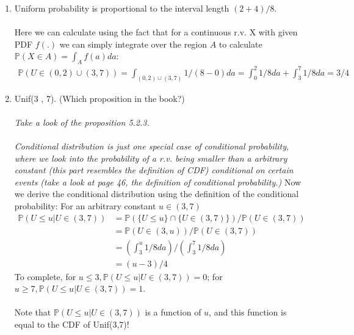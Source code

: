 

\setcounter{theorem}{9}
\begin{exercise}[BH.5.10]
\begin{solution}
    \begin{enumerate}
        \item Uniform probability is proportional to the interval length $(2+4)/8$.\\~\\
    	Here we can calculate using the fact that for a continuous r.v. X with given PDF $f(.)$ we can simply integrate over the region $A$ to calculate $\mathbb{P}(X\in A) = \int_A f(a) da$:
    	\begin{align*}
    		\mathbb{P}\left(U\in (0,2) \cup (3,7)  \right) = \int_{(0,2) \cup (3,7)} 1/(8-0) da= \int_{0}^2 1/8 da+ \int_{3}^7 1/8 da =3/4
    	\end{align*}
    	
    	\item Unif(3 , 7). (Which proposition in the book?)
    	~\\~~\\
    	\textit{Take a look of the proposition 5.2.3.}\\~\\
    	\textit{Conditional distribution is just one special case of conditional probability, where we look into the probability of a r.v. being smaller than a arbitrary constant (this part resembles the definition of CDF) conditional on certain events (take a look at page 46, the definition of conditional probability.)}
    	Now we derive the conditional distribution using the definition of the conditional probability:  
    	For an arbitrary constant $u\in (3,7)$
    	\begin{align*}
    		\mathbb{P}\left(U\leq u |U\in (3,7) \right) &= \mathbb{P}\left(\{U\leq u\} \cap \{U\in (3,7)\} \right)/ \mathbb{P}\left(U\in (3,7) \right)\\
    		& = \mathbb{P}\left( U\in (3,u)  \right)/ \mathbb{P}\left(U\in (3,7) \right)\\
    		& = \left(\int_{3}^{u}1/8 da\right) /\left(\int_{3}^{7}1/8 da\right)\\
    		& =(u-3)/4
    	\end{align*}
    	To complete, 
    	for $u\leq 3, 	\mathbb{P}\left(U\leq u |U\in (3,7) \right)=0 $; for $u\geq 7, 	\mathbb{P}\left(U\leq u |U\in (3,7) \right)=1$. \\~\\
    	Note that $	\mathbb{P}\left(U\leq u |U\in (3,7) \right)$ is a function of $u$, and this function is equal to the CDF of Unif(3,7)!
    \end{enumerate}
\end{solution}
\end{exercise}



